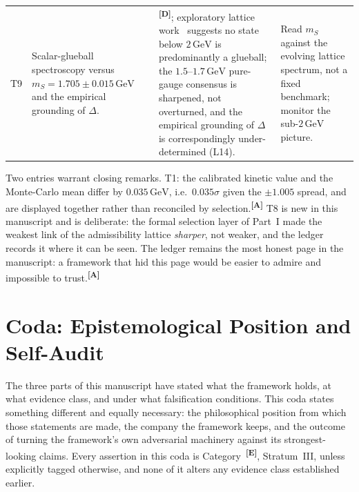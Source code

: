 \documentclass[12pt,a4paper,twoside]{article}
\theoremstyle{plain}
\theoremstyle{definition}
\theoremstyle{remark}
\newcommand{\GeV}{\,\mathrm{GeV}}
\newcommand{\catmark}[1]{\textsuperscript{\textsf{\textbf{[#1]}}}}
\begin{document}
{\begin{longtable}{p{} p{} p{} p{}}
T9 & Scalar-glueball spectroscopy versus $m_S = 1.705 \pm 0.015\GeV$ and the empirical grounding of $\Delta$. & \catmark{D}; exploratory lattice work~\cite{morningstar2024} suggests no state below $2\,\mathrm{GeV}$ is predominantly a glueball; the $1.5$--$1.7\,\mathrm{GeV}$ pure-gauge consensus is sharpened, not overturned, and the empirical grounding of $\Delta$ is correspondingly under-determined (L14). & Read $m_S$ against the evolving lattice spectrum, not a fixed benchmark; monitor the sub-$2\,\mathrm{GeV}$ picture. \\
\end{longtable}
}

\noindent Two entries warrant closing remarks. T1: the calibrated
kinetic value and the Monte-Carlo mean differ by $0.035\,\mathrm{GeV}$,
i.e.\ $0.035\sigma$ given the $\pm1.005$ spread, and are displayed together
rather than reconciled by selection.\catmark{A} T8 is new in this manuscript
and is deliberate: the formal selection layer of Part~I made the
weakest link of the admissibility lattice \emph{sharper}, not weaker,
and the ledger records it where it can be seen. The ledger remains the
most honest page in the manuscript: a framework that hid this page would
be easier to admire and impossible to trust.\catmark{A}



\newpage


\newpage
\part*{Coda: Epistemological Position and Self-Audit}
\label{part:coda}

\noindent The three parts of this manuscript have stated what the framework
holds, at what evidence class, and under what falsification conditions.
This coda states something different and equally necessary: the
philosophical position from which those statements are made, the company
the framework keeps, and the outcome of turning the framework's own
adversarial machinery against its strongest-looking claims. Every
assertion in this coda is Category~\catmark{E}, Stratum~III, unless
explicitly tagged otherwise, and none of it alters any evidence class
established earlier.
\end{document}
